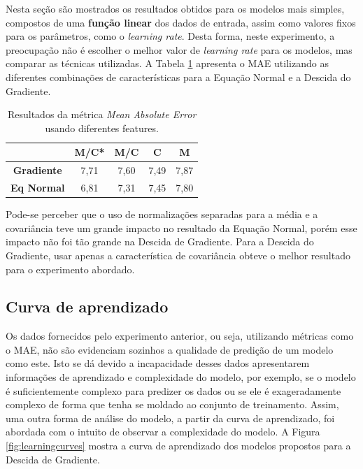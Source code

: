 \documentclass[conference]{IEEEtran}
\begin{document}
Nesta seção são mostrados os resultados obtidos para os modelos mais simples, compostos de uma \textbf{função linear} dos dados de entrada, assim como valores fixos para os parâmetros, como o \emph{learning rate}. Desta forma, neste experimento, a preocupação não é escolher o melhor valor de \textit{learning rate} para os modelos, mas comparar as técnicas utilizadas. A Tabela \ref{tab:feat} apresenta o MAE utilizando as diferentes combinações de características para a Equação Normal e a Descida do Gradiente.

\begin{table}[!h]
	\centering

	\begin{tabular}{ccccc} \hline
		\backslashbox{\textbf{Modelos}}{\textbf{Features}}  & \textbf{M/C*} & \textbf{M/C} & \textbf{C} & \textbf{M} \\ \hline
		\textbf{Gradiente} & 7,71          & 7,60         & 7,49       & 7,87       \\
		\textbf{Eq Normal} & 6,81          & 7,31         & 7,45       & 7,80       \\ \hline
	\end{tabular}

	\caption{Resultados da métrica \textit{Mean Absolute Error} usando diferentes features.}
	\label{tab:feat}
\end{table}

Pode-se perceber que o uso de normalizações separadas para a média e a covariância teve um grande impacto no resultado da Equação Normal, porém esse impacto não foi tão grande na Descida de Gradiente. Para a Descida do Gradiente, usar apenas a característica de covariância obteve o melhor resultado para o experimento abordado.



\subsection{Curva de aprendizado}

Os dados fornecidos pelo experimento anterior, ou seja, utilizando métricas como o MAE, não são evidenciam sozinhos a qualidade de predição de um modelo como este. Isto se dá devido a incapacidade desses dados apresentarem informações de aprendizado e complexidade do modelo, por exemplo, se o modelo é suficientemente complexo para predizer os dados ou se ele é exageradamente complexo de forma que tenha se moldado ao conjunto de treinamento. Assim, uma outra forma de análise do modelo, a partir da curva de aprendizado, foi abordada com o intuito de observar a complexidade do modelo. A Figura \ref{fig:learningcurves} mostra a curva de aprendizado dos modelos propostos para a Descida de Gradiente.
\end{document}
